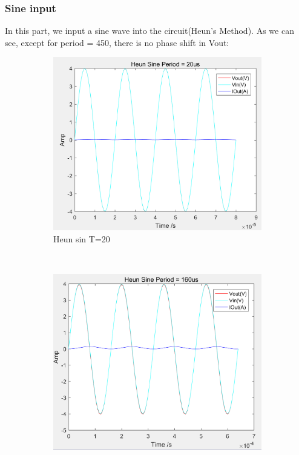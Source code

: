 \documentclass[a4paper, 12pt]{article}
\begin{document}
\subsubsection{Sine input}
In this part, we input a sine wave into the circuit(Heun's Method).
As we can see, except for period = 450, there is no phase shift in Vout:
\begin{figure}[h]
      \centering
      \begin{subfigure}[b]{0.4\textwidth}
            \includegraphics[width=\textwidth]{ex1/heun_sin_20.PNG}
            \caption{Heun sin T=20}
      \end{subfigure}
      ~
      \begin{subfigure}[b]{0.4\textwidth}
            \includegraphics[width=\textwidth]{ex1/heun_sin_160.PNG}

\end{subfigure}
\end{figure}
\end{document}
